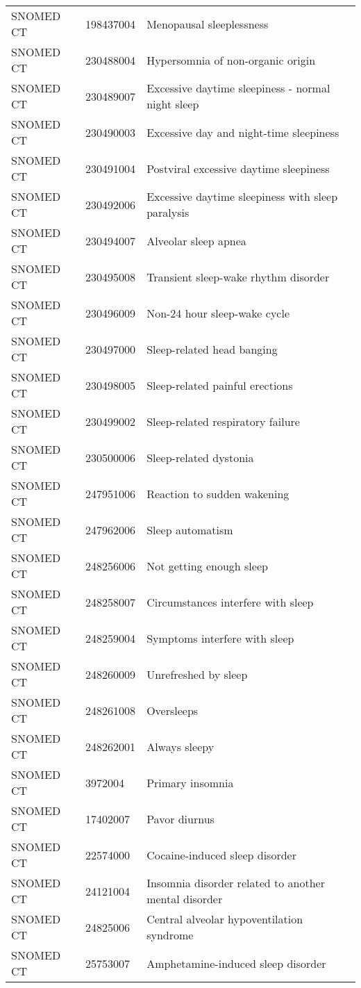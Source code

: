 \begin{longtable}{p{}p{}p{}}
  SNOMED CT & 198437004 & Menopausal sleeplessness \\ 
  SNOMED CT & 230488004 & Hypersomnia of non-organic origin \\ 
  SNOMED CT & 230489007 & Excessive daytime sleepiness - normal night sleep \\ 
  SNOMED CT & 230490003 & Excessive day and night-time sleepiness \\ 
  SNOMED CT & 230491004 & Postviral excessive daytime sleepiness \\ 
  SNOMED CT & 230492006 & Excessive daytime sleepiness with sleep paralysis \\ 
  SNOMED CT & 230494007 & Alveolar sleep apnea \\ 
  SNOMED CT & 230495008 & Transient sleep-wake rhythm disorder \\ 
  SNOMED CT & 230496009 & Non-24 hour sleep-wake cycle \\ 
  SNOMED CT & 230497000 & Sleep-related head banging \\ 
  SNOMED CT & 230498005 & Sleep-related painful erections \\ 
  SNOMED CT & 230499002 & Sleep-related respiratory failure \\ 
  SNOMED CT & 230500006 & Sleep-related dystonia \\ 
  SNOMED CT & 247951006 & Reaction to sudden wakening \\ 
  SNOMED CT & 247962006 & Sleep automatism \\ 
  SNOMED CT & 248256006 & Not getting enough sleep \\ 
  SNOMED CT & 248258007 & Circumstances interfere with sleep \\ 
  SNOMED CT & 248259004 & Symptoms interfere with sleep \\ 
  SNOMED CT & 248260009 & Unrefreshed by sleep \\ 
  SNOMED CT & 248261008 & Oversleeps \\ 
  SNOMED CT & 248262001 & Always sleepy \\ 
  SNOMED CT & 3972004 & Primary insomnia \\ 
  SNOMED CT & 17402007 & Pavor diurnus \\ 
  SNOMED CT & 22574000 & Cocaine-induced sleep disorder \\ 
  SNOMED CT & 24121004 & Insomnia disorder related to another mental disorder \\ 
  SNOMED CT & 24825006 & Central alveolar hypoventilation syndrome \\ 
  SNOMED CT & 25753007 & Amphetamine-induced sleep disorder \\ 

\end{longtable}
